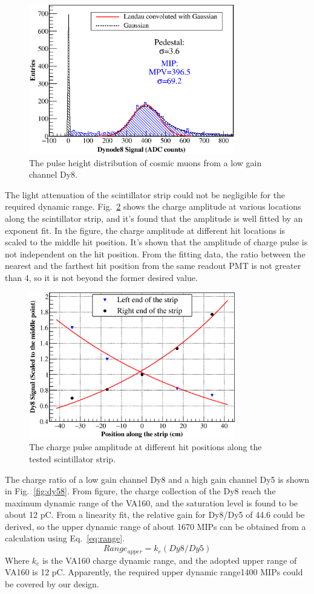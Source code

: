 \documentclass[5p, times]{elsarticle}
\begin{document}
\begin{figure}
 \centering
 \includegraphics[width=90mm]{mip}
\caption{The pulse height distribution of cosmic muons from a low gain channel Dy8.}
\label{fig:mip}
\end{figure} 

The light attenuation of the scintillator strip could not be negligible for the required dynamic range. Fig.~\ref{fig:attenuation} shows
the charge amplitude at various locations along the scintillator strip, and it’s found that the amplitude is well
fitted by an exponent fit. In the figure, the charge amplitude at different hit locations is scaled to the middle hit
position. It’s shown that the amplitude of charge pulse is not independent on the hit position. From the fitting data,
the ratio between the nearest and the farthest hit position from the same readout PMT is not greater than 4, so it is
not beyond the former desired value. 

\begin{figure}
 \centering
 \includegraphics[width=90mm]{attenuation}
\caption{The charge pulse amplitude at different hit positions along the tested scintillator strip.}
\label{fig:attenuation}
\end{figure} 

The charge ratio of a low gain channel Dy8 and a high gain channel Dy5 is shown in Fig.~\ref{fig:dy58}. From figure, the charge
collection of the Dy8 reach the maximum dynamic range of the VA160, and the saturation level is found to be about 12
pC. From a linearity fit, the relative gain for Dy8/Dy5 of 44.6 could be derived, so the upper dynamic range of about
1670 MIPs can be obtained from a calculation using Eq.~\ref{eq:range}.
\begin{equation}
 Range_{upper} = k_{e}(Dy8/Dy5)
 \label{eq:range}
\end{equation} 
Where $k_e$ is the VA160 charge dynamic range, and the adopted upper range of VA160 is 12
pC. Apparently, the required upper dynamic range1400 MIPs could be covered by our design.
\end{document}

